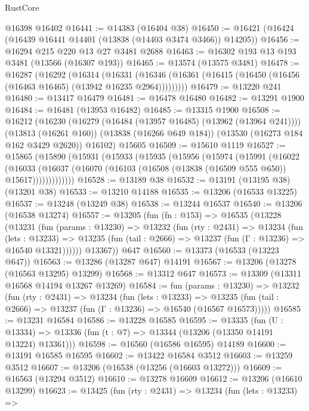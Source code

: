 \begin{lexlean}{RustCore}
\begin{coremodule}
    @16398
    @16402
@16441 := @14383 (@16404 @38)
@16450 := @16421 (@16424 (@16439 @16441 @14401 (@13838 (@14403 @3474 @3466)) @14205))
@16456 := @16294 @215 @220 @13 @27 @3481 @2688
@16463 := @16302 @193 @13 @193 @3481 (@13566 (@16307 @193))
@16465 := @13574 (@13575 @3481)
@16478 := @16287
    (@16292
      (@16314
        (@16331
          (@16346 (@16361 (@16415 (@16450 (@16456 (@16463 @16465) (@13942 @16235 @2964)))))))))
@16479 := @13220 @241
@16480 := @13417 @16479
@16481 := @16478 @16480
@16482 := @13291 @1900
@16484 := @16481 (@13953 @16482)
@16485 := @13315 @1900
@16508 := @16212
    (@16230
      (@16279 (@16484 (@13957 @16485) (@13962 (@13964 @241))))
      (@13813 (@16261 @160))
      (@13838 (@16266 @649 @184))
      (@13530 (@16273 @184 @162 @3429 @2620))
      @16102)
    @15605
@16509 := @15610 @1119
@16527 := @15865
    (@15890
      (@15931
        (@15933
          (@15935
            (@15956
              (@15974
                (@15991
                  (@16022
                    (@16033
                      (@16037
                        (@16070 (@16103 (@16508 (@13838 (@16509 @555 @650)) @15617)))))))))))))
@16528 := @13189 @38
@16532 := @13191 (@13195 @38) (@13201 @38)
@16533 := @13210 @14188
@16535 := @13206 (@16533 @13225)
@16537 := @13248 (@13249 @38)
@16538 := @13244 @16537
@16540 := @13206 (@16538 @13274)
@16557 := @13205
    (fun (fn : @153) =>
    @16535
      (@13228
        (@13231
          (fun (params : @13230) =>
          @13232
            (fun (rty : @2431) =>
            @13234
              (fun (lets : @13233) =>
              @13235 (fun (tail : @2666) => @13237 (fun (Γ : @13236) => @16540 @13321))))))
        @13367))
    @647
@16560 := @13373 (@16533 (@13223 @647))
@16563 := @13286 (@13287 @647) @14191
@16567 := @13206 (@13278 (@16563 @13295) @13299)
@16568 := @13312 @647
@16573 := @13309 (@13311 @16568 @14194 @13267 @13269)
@16584 := fun (params : @13230) =>
  @13232
    (fun (rty : @2431) =>
    @13234
      (fun (lets : @13233) =>
      @13235 (fun (tail : @2666) => @13237 (fun (Γ : @13236) => @16540 (@16567 @16573)))))
@16585 := @13231 @16584
@16586 := @13228 @16585
@16595 := @13335
    (fun (U : @13334) => @13336 (fun (t : @7) => @13344 (@13206 (@13350 @14191 @13224) @13361)))
@16598 := @16560 (@16586 @16595) @14189
@16600 := @13191 @16585 @16595
@16602 := @13422 @16584 @3512
@16603 := @13259 @3512
@16607 := @13206 (@16538 (@13256 (@16603 @13272)))
@16609 := @16563 (@13294 @3512)
@16610 := @13278 @16609
@16612 := @13206 (@16610 @13299)
@16623 := @13425
    (fun (rty : @2431) =>
    @13234
      (fun (lets : @13233) =>

\end{coremodule}
\end{lexlean}
